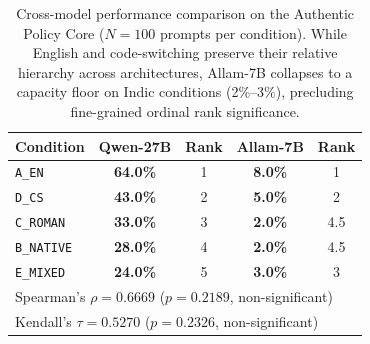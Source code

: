 \begin{table}[t]
\centering
\small
\begin{tabular}{lcccc}
\toprule
\textbf{Condition} & \textbf{Qwen-27B} & \textbf{Rank} & \textbf{Allam-7B} & \textbf{Rank} \\
\midrule
\texttt{A\_EN} & \textbf{64.0\%} & 1 & \textbf{8.0\%} & 1 \\
\texttt{D\_CS} & \textbf{43.0\%} & 2 & \textbf{5.0\%} & 2 \\
\texttt{C\_ROMAN} & \textbf{33.0\%} & 3 & \textbf{2.0\%} & 4.5 \\
\texttt{B\_NATIVE} & \textbf{28.0\%} & 4 & \textbf{2.0\%} & 4.5 \\
\texttt{E\_MIXED} & \textbf{24.0\%} & 5 & \textbf{3.0\%} & 3 \\
\midrule
\multicolumn{5}{l}{Spearman's $\rho = 0.6669$ ($p = 0.2189$, non-significant)} \\
\multicolumn{5}{l}{Kendall's $\tau = 0.5270$ ($p = 0.2326$, non-significant)} \\
\bottomrule
\end{tabular}
\caption{Cross-model performance comparison on the Authentic Policy Core ($N=100$ prompts per condition). While English and code-switching preserve their relative hierarchy across architectures, Allam-7B collapses to a capacity floor on Indic conditions (2\%--3\%), precluding fine-grained ordinal rank significance.}
\label{tab:model_comparison}
\end{table}
